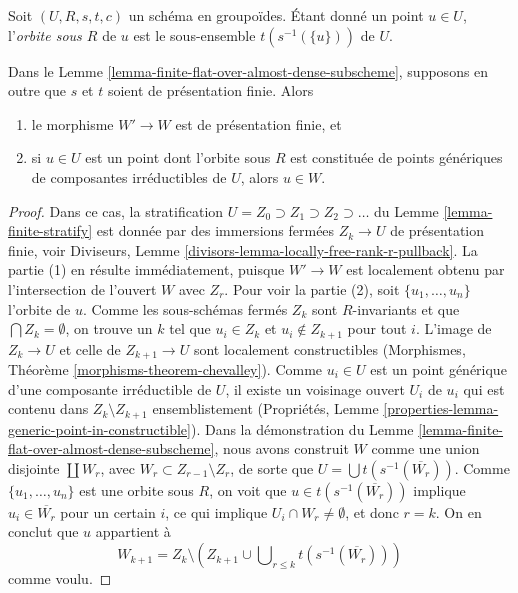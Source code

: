 \noindent
Soit $(U, R, s, t, c)$ un schéma en groupoïdes. Étant donné un point $u \in U$,
l'{\it orbite sous $R$} de $u$ est le sous-ensemble $t(s^{-1}(\{u\}))$ de $U$.

\begin{lemma}
\label{lemma-finite-flat-over-almost-dense-subscheme-addendum}
Dans le Lemme \ref{lemma-finite-flat-over-almost-dense-subscheme},
supposons en outre que $s$ et $t$ soient de présentation finie.
Alors
\begin{enumerate}
\item le morphisme $W' \to W$ est de présentation finie, et
\item si $u \in U$ est un point dont l'orbite sous $R$ est constituée de
points génériques de composantes irréductibles de $U$, alors $u \in W$.
\end{enumerate}
\end{lemma}

\begin{proof}
Dans ce cas, la stratification
$U = Z_0 \supset Z_1 \supset Z_2 \supset \ldots$ du
Lemme \ref{lemma-finite-stratify} est donnée par des immersions fermées $Z_k \to U$
de présentation finie, voir
Diviseurs, Lemme \ref{divisors-lemma-locally-free-rank-r-pullback}.
La partie (1) en résulte immédiatement, puisque $W' \to W$ est localement obtenu
par l'intersection de l'ouvert $W$ avec $Z_r$. Pour voir la partie (2),
soit $\{u_1, \ldots, u_n\}$ l'orbite de $u$.
Comme les sous-schémas fermés $Z_k$ sont $R$-invariants et que
$\bigcap Z_k = \emptyset$, on trouve un $k$ tel que $u_i \in Z_k$
et $u_i \not \in Z_{k + 1}$ pour tout $i$.
L'image de $Z_k \to U$ et celle de $Z_{k + 1} \to U$ sont localement constructibles
(Morphismes, Théorème \ref{morphisms-theorem-chevalley}).
Comme $u_i \in U$ est un point générique d'une composante irréductible
de $U$, il existe un voisinage ouvert $U_i$ de $u_i$ qui
est contenu dans $Z_k \setminus Z_{k + 1}$ ensemblistement
(Propriétés, Lemme \ref{properties-lemma-generic-point-in-constructible}).
Dans la démonstration du Lemme \ref{lemma-finite-flat-over-almost-dense-subscheme},
nous avons construit $W$ comme une union disjointe $\coprod W_r$,
avec $W_r \subset Z_{r - 1} \setminus Z_r$, de sorte que
$U = \bigcup t(s^{-1}(\overline{W_r}))$. Comme $\{u_1, \ldots, u_n\}$
est une orbite sous $R$, on voit que $u \in t(s^{-1}(\overline{W_r}))$
implique $u_i \in \overline{W_r}$ pour un certain $i$, ce qui implique
$U_i \cap W_r \not = \emptyset$, et donc $r = k$.
On en conclut que $u$ appartient à
$$
W_{k + 1} = Z_k \setminus
\left(
Z_{k + 1} \cup \bigcup\nolimits_{r \leq k} t(s^{-1}(\overline{W_r}))
\right)
$$
comme voulu.
\end{proof}


